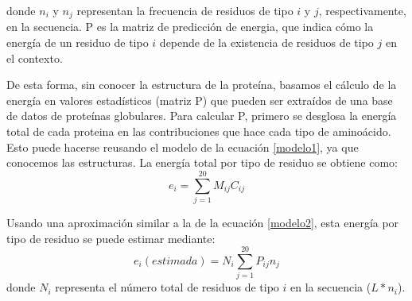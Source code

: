 \noindent donde $n_i$ y $n_j$ representan la frecuencia de residuos de tipo $i$ y $j$, respectivamente, en la secuencia.
P es la matriz de predicción de energia, que indica cómo la energía de un residuo de tipo $i$ depende de la existencia de residuos de tipo $j$ en el contexto.



De esta forma, sin conocer la estructura de la proteína, basamos el cálculo de la energía en valores estadísticos (matriz P) que pueden ser extraídos de una base de datos de proteínas globulares.
Para calcular P, primero se desglosa la energía total de cada proteina en las contribuciones que hace cada tipo de aminoácido.
Esto puede hacerse reusando el modelo de la ecuación \ref{modelo1}, ya que conocemos las estructuras. 
La energía total por tipo de residuo se obtiene como:
\begin{equation}\label{ek1}
  e_i = \sum_{j=1}^{20} M_{ij}C_{ij}
\end{equation}

Usando una aproximación similar a la de la ecuación \ref{modelo2}, esta energía por tipo de residuo se puede estimar mediante:
\begin{equation}\label{ek2}
e_i(estimada) = N_i\sum_{j=1}^{20} P_{ij}n_{j}
\end{equation}
\noindent donde $N_i$ representa el número total de residuos de tipo $i$ en la secuencia ($L*n_i$).

